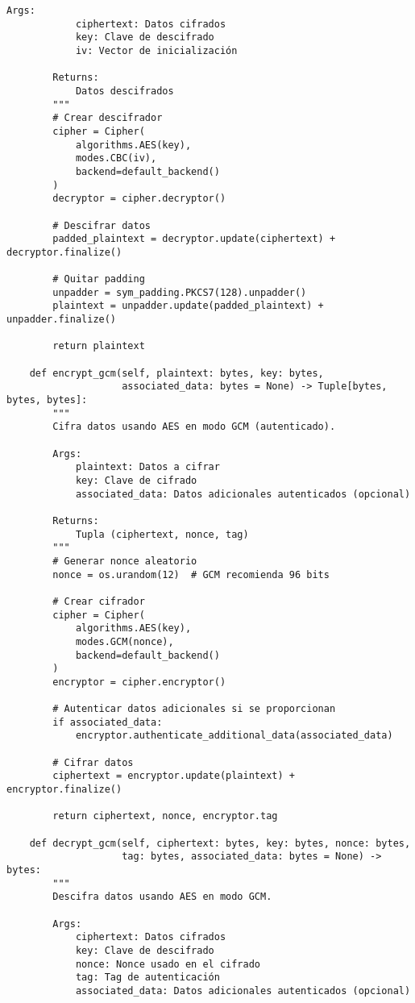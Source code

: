 \documentclass[12pt,a4paper]{article}
\begin{document}
\begin{lstlisting}[caption=Implementación de cifrado simétrico con AES]
        Args:
            ciphertext: Datos cifrados
            key: Clave de descifrado
            iv: Vector de inicialización
            
        Returns:
            Datos descifrados
        """
        # Crear descifrador
        cipher = Cipher(
            algorithms.AES(key),
            modes.CBC(iv),
            backend=default_backend()
        )
        decryptor = cipher.decryptor()
        
        # Descifrar datos
        padded_plaintext = decryptor.update(ciphertext) + decryptor.finalize()
        
        # Quitar padding
        unpadder = sym_padding.PKCS7(128).unpadder()
        plaintext = unpadder.update(padded_plaintext) + unpadder.finalize()
        
        return plaintext
    
    def encrypt_gcm(self, plaintext: bytes, key: bytes, 
                    associated_data: bytes = None) -> Tuple[bytes, bytes, bytes]:
        """
        Cifra datos usando AES en modo GCM (autenticado).
        
        Args:
            plaintext: Datos a cifrar
            key: Clave de cifrado
            associated_data: Datos adicionales autenticados (opcional)
            
        Returns:
            Tupla (ciphertext, nonce, tag)
        """
        # Generar nonce aleatorio
        nonce = os.urandom(12)  # GCM recomienda 96 bits
        
        # Crear cifrador
        cipher = Cipher(
            algorithms.AES(key),
            modes.GCM(nonce),
            backend=default_backend()
        )
        encryptor = cipher.encryptor()
        
        # Autenticar datos adicionales si se proporcionan
        if associated_data:
            encryptor.authenticate_additional_data(associated_data)
        
        # Cifrar datos
        ciphertext = encryptor.update(plaintext) + encryptor.finalize()
        
        return ciphertext, nonce, encryptor.tag
    
    def decrypt_gcm(self, ciphertext: bytes, key: bytes, nonce: bytes, 
                    tag: bytes, associated_data: bytes = None) -> bytes:
        """
        Descifra datos usando AES en modo GCM.
        
        Args:
            ciphertext: Datos cifrados
            key: Clave de descifrado
            nonce: Nonce usado en el cifrado
            tag: Tag de autenticación
            associated_data: Datos adicionales autenticados (opcional)
            

\end{lstlisting}
\end{document}
